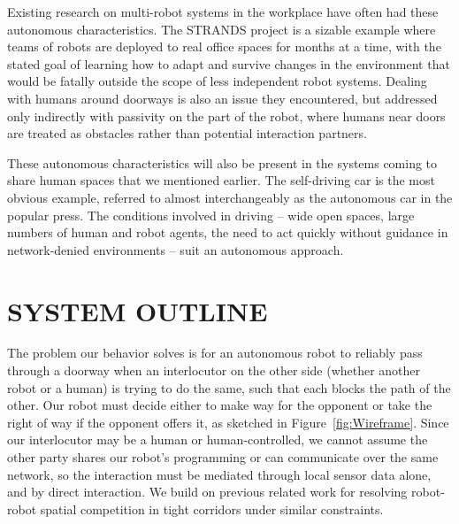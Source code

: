 \documentclass[letterpaper, 10 pt, conference]{ieeeconf}  %
\begin{document}

Existing research on multi-robot systems in the workplace have often had these autonomous characteristics. The STRANDS project\cite{hawes2016strands} is a sizable example where teams of robots are deployed to real office spaces for months at a time, with the stated goal of learning how to adapt and survive changes in the environment that would be fatally outside the scope of less independent robot systems. Dealing with humans around doorways is also an issue they encountered, but addressed only indirectly with passivity on the part of the robot, where humans near doors are treated as obstacles rather than potential interaction partners.

These autonomous characteristics will also be present in the systems coming to share human spaces that we mentioned earlier. The self-driving car is the most obvious example, referred to almost interchangeably as the autonomous car in the popular press\cite{EconomistAuto}. The conditions involved in driving – wide open spaces, large numbers of human and robot agents, the need to act quickly without guidance in network-denied environments – suit an autonomous approach.


\section{SYSTEM OUTLINE}

The problem our behavior solves is for an autonomous robot to reliably pass through a doorway when an interlocutor on the other side (whether another robot or a human) is trying to do the same, such that each blocks the path of the other. Our robot must decide either to make way for the opponent or take the right of way if the opponent offers it, as sketched in Figure~\ref{fig:Wireframe}. Since our interlocutor may be a human or human-controlled, we cannot assume the other party shares our robot’s programming or can communicate over the same network, so the interaction must be mediated through local sensor data alone, and by direct interaction. We build on previous related work for resolving robot-robot spatial competition in tight corridors under similar constraints.
\end{document}
